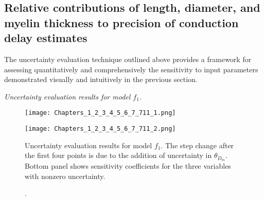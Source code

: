 \subsection{Relative contributions of length, diameter, and myelin thickness to precision of conduction delay estimates}

The uncertainty evaluation technique outlined above provides a framework for assessing quantitatively and comprehensively the sensitivity to input parameters demonstrated visually and intuitively in the previous section. 



\emph{Uncertainty evaluation results for model $f_1$.}


\begin{figure}[h!]
\begin{center}
\texttt{[image: Chapters\_1\_2\_3\_4\_5\_6\_7\_711\_1.png]}%
\end{center}
\begin{center}
\texttt{[image: Chapters\_1\_2\_3\_4\_5\_6\_7\_711\_2.png]}%
\end{center}

\caption[\emph{Uncertainty evaluation results for model $f_1$.}]. Uncertainty evaluation results for model $f_1$. The step change after the first four points is due to the addition of uncertainty in $\theta_{D_m}$. Bottom panel shows sensitivity coefficients for the three variables with nonzero uncertainty.
\end{figure}




